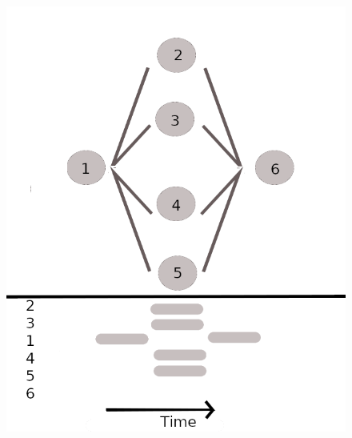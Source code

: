 \documentclass[12pt,notitlepage]{article}
\begin{document}
\begin{figure}
\centering
\begin{minipage}{.5\linewidth}
\centering
\includegraphics[scale=0.3]{img/fig1a.png}
\end{minipage}%
\begin{minipage}{.5\linewidth}
\centering

\end{minipage}
\end{figure}
\end{document}
